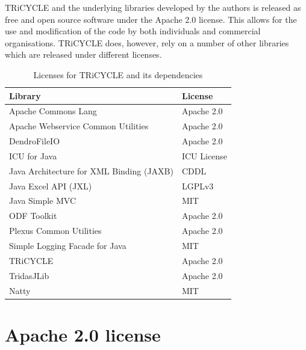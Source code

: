 \documentclass[10pt, headsepline,DIV14,BCOR0.5cm]{scrreprt}
\begin{document}
TRiCYCLE and the underlying libraries developed by the authors is released as free and open source software under the Apache 2.0 license.  This allows for the use and modification of the code by both individuals and commercial organisations.  TRiCYCLE does, however, rely on a number of other libraries which are released under different licenses.


\begin{table}[htbp]
\begin{center}
\caption{Licenses for TRiCYCLE and its dependencies}
\begin{tabular*}{12cm}{ l @{\extracolsep{\fill}} l }
  \toprule
 Library & License \\
 \midrule

Apache Commons Lang & Apache 2.0 \\ 
Apache Webservice Common Utilities & Apache 2.0 \\
DendroFileIO & Apache 2.0 \\
ICU for Java & ICU License \\
Java Architecture for XML Binding (JAXB) & CDDL \\
Java Excel API (JXL) & LGPLv3 \\
Java Simple MVC & MIT \\
ODF Toolkit & Apache 2.0 \\
Plexus Common Utilities & Apache 2.0 \\
Simple Logging Facade for Java & MIT \\
TRiCYCLE & Apache 2.0 \\
TridasJLib & Apache 2.0 \\
Natty & MIT \\


\bottomrule
\end{tabular*}
\end{center}
\end{table}


\section{Apache 2.0 license}
\end{document}
